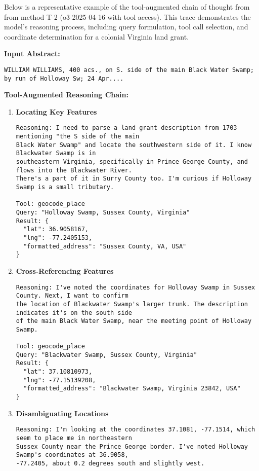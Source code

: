 Below is a representative example of the tool-augmented chain of thought
from from method T-2 (o3-2025-04-16 with tool access). This trace
demonstrates the model's reasoning process, including query formulation,
tool call selection, and coordinate determination for a colonial
Virginia land grant.

\textbf{Input Abstract:}

\begin{lstlisting}
WILLIAM WILLIAMS, 400 acs., on S. side of the main Black Water Swamp; by run of Holloway Sw; 24 Apr....
\end{lstlisting}

\textbf{Tool-Augmented Reasoning Chain:}

\begin{enumerate}
\def\labelenumi{\arabic{enumi}.}
\item
  \textbf{Locating Key Features}

\begin{lstlisting}
Reasoning: I need to parse a land grant description from 1703 mentioning "the S side of the main 
Black Water Swamp" and locate the southwestern side of it. I know Blackwater Swamp is in 
southeastern Virginia, specifically in Prince George County, and flows into the Blackwater River. 
There's a part of it in Surry County too. I'm curious if Holloway Swamp is a small tributary.

Tool: geocode_place
Query: "Holloway Swamp, Sussex County, Virginia"
Result: {
  "lat": 36.9058167, 
  "lng": -77.2405153, 
  "formatted_address": "Sussex County, VA, USA"
}
\end{lstlisting}
\item
  \textbf{Cross-Referencing Features}

\begin{lstlisting}
Reasoning: I've noted the coordinates for Holloway Swamp in Sussex County. Next, I want to confirm 
the location of Blackwater Swamp's larger trunk. The description indicates it's on the south side 
of the main Black Water Swamp, near the meeting point of Holloway Swamp.

Tool: geocode_place
Query: "Blackwater Swamp, Sussex County, Virginia"
Result: {
  "lat": 37.10810973, 
  "lng": -77.15139208, 
  "formatted_address": "Blackwater Swamp, Virginia 23842, USA"
}
\end{lstlisting}
\item
  \textbf{Disambiguating Locations}

\begin{lstlisting}
Reasoning: I'm looking at the coordinates 37.1081, -77.1514, which seem to place me in northeastern 
Sussex County near the Prince George border. I've noted Holloway Swamp's coordinates at 36.9058, 
-77.2405, about 0.2 degrees south and slightly west.


\end{lstlisting}
\end{enumerate}
